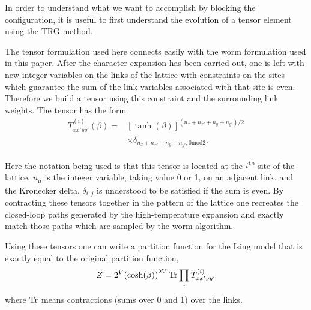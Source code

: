 \documentclass[../main.tex]{subfiles}
\begin{document}
In order to understand what we want to accomplish by blocking the \lc
configuration, it is useful to first understand the evolution of a tensor
element using the TRG method. 

The tensor formulation used here connects easily with  the worm formulation
used in this paper.  After the character expansion has been carried out, one is
left with new integer variables on the links of the lattice with constraints on
the sites which guarantee the sum of the link variables associated with that
site is even.  Therefore we build a tensor using this constraint and the
surrounding link weights.  The tensor has the form
%
\begin{align}
    T^{(i)}_{x x' y y'}(\beta) = 
    &{\left[\tanh(\beta)\right]}^{(n_{x}+n_{x'}+n_{y}+n_{y'})/2}\nonumber \\
    &\times \delta_{n_{x}+n_{x'}+n_{y}+n_{y'}, 0\text{mod}2}.
\end{align}

Here the notation being used is that this tensor is located at the
$i$\textsuperscript{th} site of the lattice, $n_{\hat{\mu}}$ is the integer
variable, taking value 0 or 1, on an adjacent link, and the Kronecker delta,
$\delta_{i,j}$ is understood to be satisfied if the sum is even.  By
contracting these tensors together in the pattern of the lattice one recreates
the closed-loop paths generated by the high-temperature expansion and exactly
match those paths which are sampled by the worm algorithm.

Using these tensors one can write a partition function for the Ising model that
is exactly equal to the original partition function,
%
\begin{equation}
Z =2^V {(\cosh (\beta))}^{2V}\operatorname{Tr} \prod_{i}T^{(i)}_{xx'yy'} 
\end{equation} 
%
where $\operatorname{Tr}$ means contractions (sums over 0 and 1) over the links. 
\end{document}
